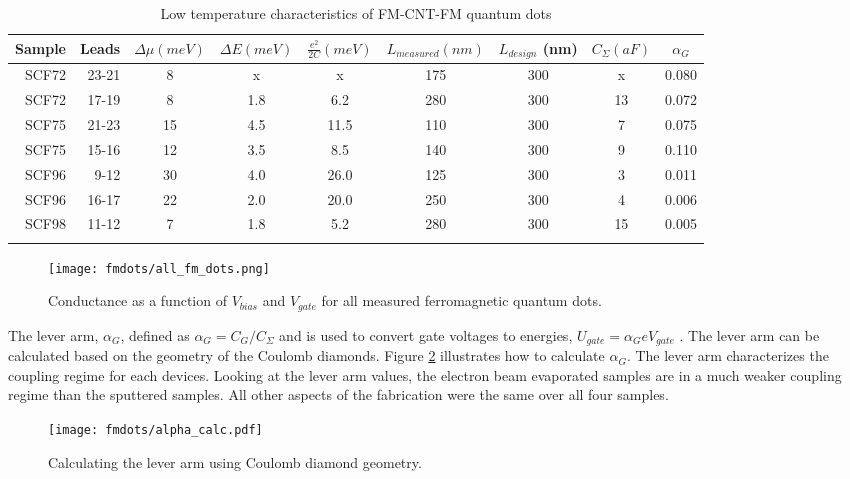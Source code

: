 \begin{table}
    \centering
    \footnotesize
    \begin{tabular}{ r | r | c c c c c c c}
        Sample & Leads & $\Delta \mu (meV)$ & $\Delta E (meV)$ & $\frac{e^2}{2C} (meV)$ & $L_{measured} (nm)$ & $L_{design}$ (nm) & $C_{\Sigma} (aF)$ & $\alpha_{G}$ \\ \hline
        SCF72 & 23-21 & 8  & x   & x    & 175 & 300 & x  & 0.080 \\ 
        SCF72 & 17-19 & 8  & 1.8 & 6.2  & 280 & 300 & 13 & 0.072 \\
        SCF75 & 21-23 & 15 & 4.5 & 11.5 & 110 & 300 & 7  & 0.075 \\
        SCF75 & 15-16 & 12 & 3.5 & 8.5  & 140 & 300 & 9  & 0.110 \\
        SCF96 & 9-12  & 30 & 4.0 & 26.0 & 125 & 300 & 3  & 0.011 \\
        SCF96 & 16-17 & 22 & 2.0 & 20.0 & 250 & 300 & 4  & 0.006 \\
        SCF98 & 11-12 & 7  & 1.8 & 5.2  & 280 & 300 & 15 & 0.005 \\
        \label{table:cold_fm_devices}  
    \end{tabular}
    \caption{Low temperature characteristics of FM-CNT-FM quantum dots}
\end{table}

\begin{figure}
    \centering
    \texttt{[image: fmdots/all\_fm\_dots.png]}
    \caption{Conductance as a function of $V_{bias}$ and $V_{gate}$ for all measured ferromagnetic quantum dots.}
    \label{fig:all_FM_QD}
\end{figure}

The lever arm, $\alpha_{G}$, defined as $\alpha_{G} = C_G/C_{\Sigma}$ and is used to convert gate voltages to energies, $U_{gate} = \alpha_{G}eV_{gate}$ \cite{Ihn2004}. The lever arm can be calculated based on the geometry of the Coulomb diamonds. Figure \ref{fig:alpha_calc} illustrates how to calculate $\alpha_{G}$. The lever arm characterizes the coupling regime for each devices. Looking at the lever arm values, the electron beam evaporated samples are in a much weaker coupling regime than the sputtered samples. All other aspects of the fabrication were the same over all four samples. 

\begin{figure}
    \centering
    \texttt{[image: fmdots/alpha\_calc.pdf]}
    \caption{Calculating the lever arm using Coulomb diamond geometry.}
    \label{fig:alpha_calc}
\end{figure}

